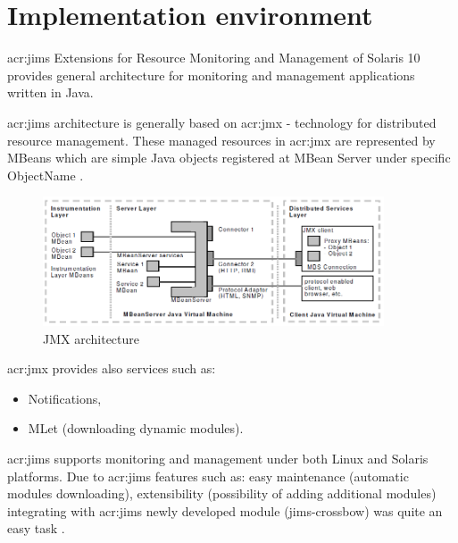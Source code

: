 \documentclass[11pt]{book}
\begin{document}
    \section{Implementation environment}
    \label{sec:impl:env}

      \gls{acr:jims} Extensions for Resource Monitoring and Management of Solaris 10 provides general architecture for
      monitoring and management applications written in Java.

      \gls{acr:jims} architecture is generally based on \gls{acr:jmx} - technology for distributed resource management.
      These managed resources in \gls{acr:jmx} are represented by MBeans which are simple Java objects registered at
      MBean Server under specific ObjectName \cite{jims}.
    
      \begin{figure}[H]
        \begin{center}
          \includegraphics[width=0.9\textwidth]{img/jims/jmx.png}
        \end{center}
        \caption{JMX architecture \cite{jims}}
      \end{figure}
	
      \gls{acr:jmx} provides also services such as:

      \begin{itemize}
        \item Notifications,
        \item MLet (downloading dynamic modules).
      \end{itemize}
	
      \gls{acr:jims} supports monitoring and management under both Linux and Solaris platforms. Due to \gls{acr:jims}
      features such as: easy maintenance (automatic modules downloading), extensibility (possibility of adding
      additional modules) integrating with \gls{acr:jims} newly developed module (jims-crossbow) was quite an easy task
      \cite{jims}.
    
\end{document}

